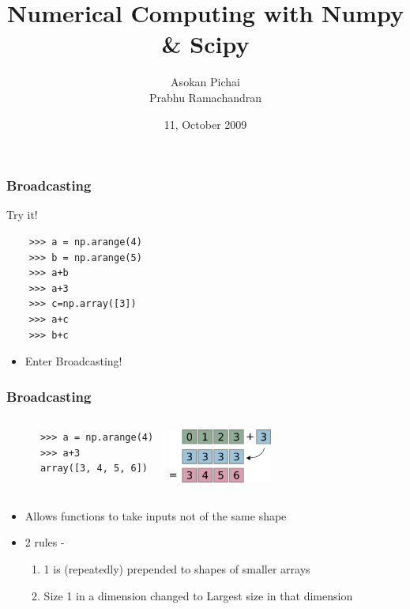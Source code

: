 \documentclass[14pt,compress]{beamer}
\title[]{Numerical Computing with Numpy \& Scipy}
\author[FOSSEE Team] {Asokan Pichai\\Prabhu Ramachandran}
\institute[IIT Bombay] {Department of Aerospace Engineering\\IIT Bombay}
\date[] {11, October 2009}
\begin{document}
\begin{frame}
  \maketitle
\end{frame}
\begin{frame}[fragile]
  \frametitle{Broadcasting}
  Try it!
  \begin{lstlisting}
    >>> a = np.arange(4)
    >>> b = np.arange(5)
    >>> a+b
    >>> a+3
    >>> c=np.array([3])
    >>> a+c
    >>> b+c
  \end{lstlisting}
  \begin{itemize}
    \item Enter Broadcasting!
  \end{itemize}
\end{frame}

\begin{frame}[fragile]
  \frametitle{Broadcasting}
  \begin{columns}
    \hspace*{-1.5in}
    \begin{lstlisting}
      >>> a = np.arange(4)
      >>> a+3
      array([3, 4, 5, 6])
    \end{lstlisting}
    \includegraphics[height=0.7in, interpolate=true]{data/broadcast_scalar}
  \end{columns}
  \begin{itemize}
    \item Allows functions to take inputs not of the same shape
    \item 2 rules -
      \begin{enumerate}
      \item 1 is (repeatedly) prepended to shapes of smaller arrays
      \item Size 1 in a dimension changed to Largest size in that dimension
      \end{enumerate}
  \end{itemize}
\end{frame}
\end{document}
